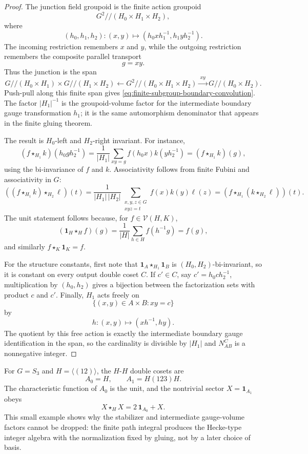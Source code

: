 \begin{proof}
The junction field groupoid is the finite action groupoid
\[
  G^2//(H_0\times H_1\times H_2),
\]
where
\[
  (h_0,h_1,h_2):(x,y)
  \longmapsto
  (h_0xh_1^{-1},h_1yh_2^{-1}).
\]
The incoming restriction remembers \(x\) and \(y\), while the outgoing
restriction remembers the composite parallel transport
\[
  g=xy.
\]
Thus the junction is the span
\[
  G//(H_0\times H_1)\times G//(H_1\times H_2)
  \xleftarrow{\ }
  G^2//(H_0\times H_1\times H_2)
  \xrightarrow{\ xy\ }
  G//(H_0\times H_2).
\]
Push-pull along this finite span gives
\eqref{eq:finite-subgroup-boundary-convolution}.  The factor
\(|H_1|^{-1}\) is the groupoid-volume factor for the intermediate boundary
gauge transformation \(h_1\); it is the same automorphism denominator that
appears in the finite gluing theorem.

The result is \(H_0\)-left and \(H_2\)-right invariant.  For instance,
\[
  (f\star_{H_1}k)(h_0gh_2^{-1})
  =
  \frac{1}{|H_1|}
  \sum_{xy=g} f(h_0x)k(yh_2^{-1})
  =
  (f\star_{H_1}k)(g),
\]
using the bi-invariance of \(f\) and \(k\).  Associativity follows from
finite Fubini and associativity in \(G\):
\[
  ((f\star_{H_1}k)\star_{H_2}\ell)(t)
  =
  \frac{1}{|H_1|\,|H_2|}
  \sum_{\substack{x,y,z\in G\\ xyz=t}}
  f(x)k(y)\ell(z)
  =
  (f\star_{H_1}(k\star_{H_2}\ell))(t).
\]
The unit statement follows because, for
\(f\in\mathcal V(H,K)\),
\[
  (\mathbf 1_H\star_H f)(g)
  =
  \frac{1}{|H|}
  \sum_{h\in H} f(h^{-1}g)
  =
  f(g),
\]
and similarly \(f\star_K\mathbf 1_K=f\).

For the structure constants, first note that
\(\mathbf 1_A\star_{H_1}\mathbf 1_B\) is
\((H_0,H_2)\)-bi-invariant, so it is constant on every output double coset
\(C\).  If \(c'\in C\), say \(c'=h_0ch_2^{-1}\), multiplication by
\((h_0,h_2)\) gives a bijection between the factorization sets with product
\(c\) and \(c'\).  Finally, \(H_1\) acts freely on
\[
  \{(x,y)\in A\times B:xy=c\}
\]
by
\[
  h:(x,y)\longmapsto (xh^{-1},hy).
\]
The quotient by this free action is exactly the intermediate boundary gauge
identification in the span, so the cardinality is divisible by \(|H_1|\) and
\(N_{AB}^C\) is a nonnegative integer.
\end{proof}

For \(G=S_3\) and \(H=\langle(12)\rangle\), the \(H\)-\(H\) double cosets are
\[
  A_0=H,\qquad A_1=H(123)H.
\]
The characteristic function of \(A_0\) is the unit, and the nontrivial sector
\(X=\mathbf 1_{A_1}\) obeys
\[
  X\star_H X=2\,\mathbf 1_{A_0}+X.
\]
This small example shows why the stabilizer and intermediate gauge-volume
factors cannot be dropped: the finite path integral produces the Hecke-type
integer algebra with the normalization fixed by gluing, not by a later
choice of basis.

